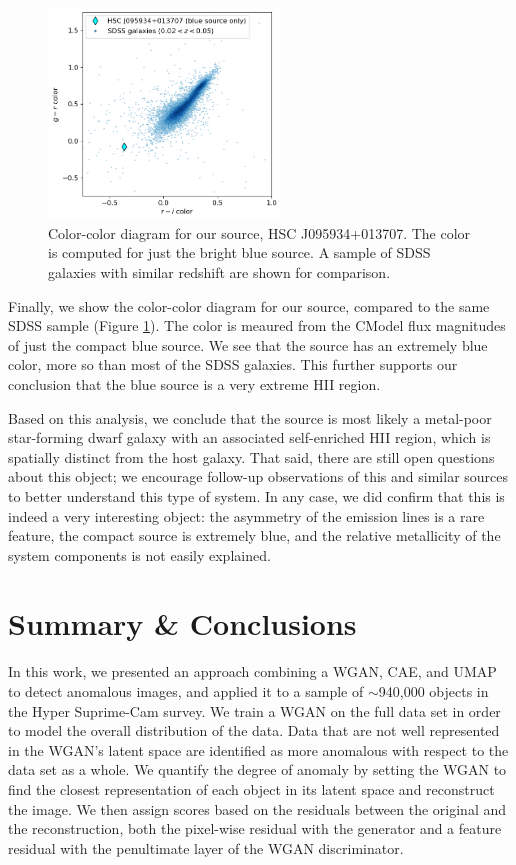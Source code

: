 \begin{figure}
    \centering
    \includegraphics[width=0.55\textwidth]{color-color}
    \caption{Color-color diagram for our source, HSC J095934+013707. The color is computed for just the bright blue source. A sample of SDSS galaxies with similar redshift are shown for comparison.}
    \label{fig:color-color}
\end{figure}

Finally, we show the color-color diagram for our source, compared to the same SDSS sample (Figure \ref{fig:color-color}).
The color is meaured from the CModel flux magnitudes of just the compact blue source.
We see that the source has an extremely blue color, more so than most of the SDSS galaxies.
This further supports our conclusion that the blue source is a very extreme HII region.

Based on this analysis, we conclude that the source is most likely a metal-poor star-forming dwarf galaxy with an associated self-enriched HII region, which is spatially distinct from the host galaxy. 
That said, there are still open questions about this object; we encourage follow-up observations of this and similar sources to better understand this type of system.
In any case, we did confirm that this is indeed a very interesting object: the asymmetry of the emission lines is a rare feature, the compact source is extremely blue, and the relative metallicity of the system components is not easily explained.

%


\section{Summary \& Conclusions}
\label{sec:conclusions}

In this work, we presented an approach combining a WGAN, CAE, and UMAP to detect anomalous images, and applied it to a sample of $\sim$940,000 objects in the Hyper Suprime-Cam survey.
We train a WGAN on the full data set in order to model the overall distribution of the data.
Data that are not well represented in the WGAN's latent space are identified as more anomalous with respect to the data set as a whole.
We quantify the degree of anomaly by setting the WGAN to find the closest representation of each object in its latent space and reconstruct the image.
We then assign scores based on the residuals between the original and the reconstruction, both the pixel-wise residual with the generator and a feature residual with the penultimate layer of the WGAN discriminator.

